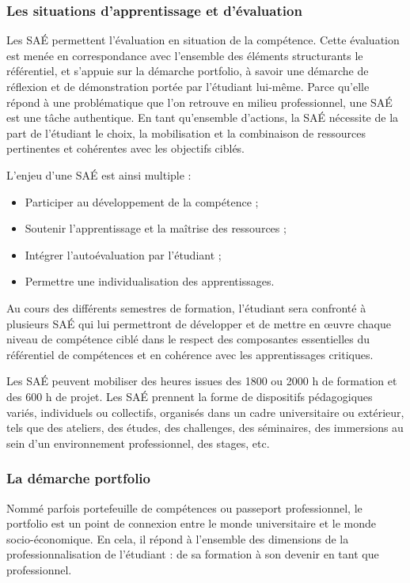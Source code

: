\documentclass[10pt]{article}
\begin{document}
\subsubsection*{Les situations d’apprentissage et d’évaluation}
Les SAÉ permettent l’évaluation en situation de la compétence. Cette
évaluation est menée en correspondance avec l’ensemble des éléments
structurants le référentiel, et s’appuie sur la démarche portfolio, à
savoir une démarche de réflexion et de démonstration portée par
l’étudiant lui-même.  Parce qu’elle répond à une problématique que l’on
retrouve en milieu professionnel, une SAÉ est une tâche authentique.  En
tant qu’ensemble d’actions, la SAÉ nécessite de la part de l’étudiant le
choix, la mobilisation et la combinaison de ressources pertinentes et
cohérentes avec les objectifs ciblés.

L’enjeu d’une SAÉ est ainsi multiple :
\begin{itemize}
\item Participer au développement de la compétence ;
\item Soutenir l’apprentissage et la maîtrise des ressources ;
\item Intégrer l’autoévaluation par l’étudiant ;
\item Permettre une individualisation des apprentissages.
\end{itemize}

Au cours des différents semestres de formation, l’étudiant sera
confronté à plusieurs SAÉ qui lui permettront de développer et de mettre
en œuvre chaque niveau de compétence ciblé dans le respect des
composantes essentielles du référentiel de compétences et en cohérence
avec les apprentissages critiques.

Les SAÉ peuvent mobiliser des heures issues des 1800 ou 2000 h de
formation et des 600 h de projet. Les SAÉ prennent la forme de
dispositifs pédagogiques variés, individuels ou collectifs, organisés
dans un cadre universitaire ou extérieur, tels que des ateliers, des
études, des challenges, des séminaires, des immersions au sein d’un
environnement professionnel, des stages, etc.

\subsubsection*{La démarche portfolio}
Nommé parfois portefeuille de compétences ou passeport professionnel, le
portfolio est un point de connexion entre le monde universitaire et le
monde socio-économique. En cela, il répond à l’ensemble des dimensions
de la professionnalisation de l’étudiant : de sa formation à son devenir
en tant que professionnel.
\end{document}
